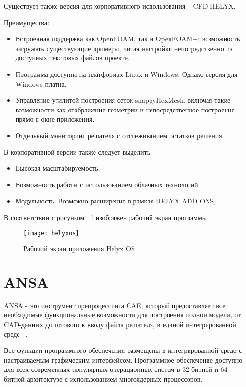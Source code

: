 \documentclass[14pt]{extreport}
\begin{document}
Существует также версия для корпоративного использования -- CFD HELYX.

Преимущества: 
\begin{itemize}
\item Встроенная поддержка как OpenFOAM, так и OpenFOAM+: возможность загружать существующие примеры, читая настройки непосредственно из доступных текстовых файлов проекта.
\item Программа доступна на платформах Linux и Windows. Однако версия для Windows платна.
\item Управление утилитой построения сеток snappyHexMesh, включая такие возможности как отображение геометрии и непосредственное построение прямо в окне приложения.
\item Отдельный мониторинг решателя с отслеживанием остатков решения.
\end{itemize}

В корпоративной версии также следует выделить:
\begin{itemize}
\item Высокая масштабируемость.
\item Возможность работы с использованием облачных технологий.
\item Модульность. Возможно расширение в рамках HELYX ADD-ONS, 
\end{itemize}

В соответствии с рисунком ~\ref{fig2} изображен рабочий экран программы.

\begin{figure}[H]
\centerline{\texttt{[image: helyxos]}}
\caption{Рабочий экран приложения Helyx OS}
\label{fig2}
\end{figure}

\section{ANSA}
ANSA - это инструмент препроцессинга CAE, который предоставляет все необходимые функциональные возможности для построения полной модели, от CAD-данных  до готового к вводу файла решателя, в единой интегрированной среде ~\cite{Ansa}.

Все функции программного обеспечения размещены в интегрированной среде с настраиваемым графическим интерфейсом. Программное обеспечение доступно для всех современных популярных операционных систем в 32-битной и 64-битной архитектуре с использованием многоядерных процессоров. 
\end{document}
